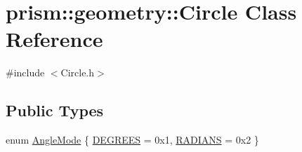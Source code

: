 \hypertarget{classprism_1_1geometry_1_1_circle}{}\section{prism\+:\+:geometry\+:\+:Circle Class Reference}
\label{classprism_1_1geometry_1_1_circle}


{\ttfamily \#include $<$Circle.\+h$>$}

\subsection*{Public Types}
\begin{DoxyCompactItemize}
\item 
enum \hyperlink{classprism_1_1geometry_1_1_circle_abf09b3319057626836fd7446ee1ac074}{Angle\+Mode} \{ \hyperlink{classprism_1_1geometry_1_1_circle_abf09b3319057626836fd7446ee1ac074a129fdcf5e1cb41ce9c1b9a7614add31a}{D\+E\+G\+R\+E\+ES} = 0x1, 
\hyperlink{classprism_1_1geometry_1_1_circle_abf09b3319057626836fd7446ee1ac074a505eab4762e08f35c8381febeb2fc11f}{R\+A\+D\+I\+A\+NS} = 0x2
 \}
\end{DoxyCompactItemize}
